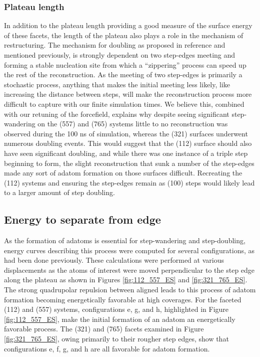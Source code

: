 \subsubsection{Plateau length}
In addition to the plateau length providing a good measure of the surface
energy of these facets, the length of the plateau also plays a role in the
mechanism of restructuring. The mechanism for doubling as proposed in reference
\citep{Michalka:2013aa} and mentioned previously, is strongly dependent on
two step-edges meeting and forming a stable nucleation site from which a
``zippering'' process can speed up the rest of the reconstruction. As the
meeting of two step-edges is primarily a stochastic process, anything that
makes the initial meeting less likely, like increasing the distance between
steps, will make the reconstruction process more difficult to capture with our
finite simulation times. We believe this, combined with our retuning of the
 forcefield, explains why despite seeing significant
step-wandering on the (557) and (765) systems little to no reconstruction was
observed during the 100 ns of simulation, whereas the (321) surfaces underwent
numerous doubling events. This would suggest that the (112) surface should also
have seen significant doubling, and while there was one instance of a triple
step beginning to form, the slight reconstruction that sunk a number of the
step-edges made any sort of adatom formation on those surfaces difficult.
Recreating the (112) systems and ensuring the step-edges remain as (100) steps
would likely lead to a larger amount of step doubling.

\subsection{Energy to separate from edge}
As the formation of adatoms is essential for step-wandering and step-doubling,
energy curves describing this process were computed for several 
configurations, as had been done previously.  \citep{Michalka:2015aa,
Michalka:2013aa} These calculations were performed at various displacements as
the atoms of interest were moved perpendicular to the step edge along the
plateau as shown in Figures \ref{fig:112_557_ES} and \ref{fig:321_765_ES}. The
strong quadrupolar repulsion between aligned  leads to this process of
adatom formation becoming energetically favorable at high coverages. For the
faceted (112) and (557) systems, configurations e, g, and h, highlighted in
Figure \ref{fig:112_557_ES}, make the initial formation of an adatom an
energetically favorable process. The (321) and (765) facets examined in Figure
\ref{fig:321_765_ES}, owing primarily to their rougher step edges, show that
configurations e, f, g, and h are all favorable for adatom formation.

